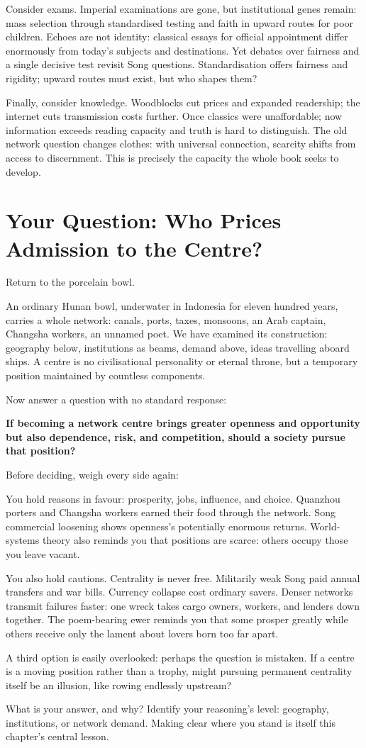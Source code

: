 Consider exams. Imperial examinations are gone, but institutional genes remain: mass selection through standardised testing and faith in upward routes for poor children. Echoes are not identity: classical essays for official appointment differ enormously from today's subjects and destinations. Yet debates over fairness and a single decisive test revisit Song questions. Standardisation offers fairness and rigidity; upward routes must exist, but who shapes them?

Finally, consider knowledge. Woodblocks cut prices and expanded readership; the internet cuts transmission costs further. Once classics were unaffordable; now information exceeds reading capacity and truth is hard to distinguish. The old network question changes clothes: with universal connection, scarcity shifts from access to discernment. This is precisely the capacity the whole book seeks to develop.

\section[Your Question: Pricing Centrality]{Your Question: Who Prices Admission to the Centre?}
Return to the porcelain bowl.

An ordinary Hunan bowl, underwater in Indonesia for eleven hundred years, carries a whole network: canals, ports, taxes, monsoons, an Arab captain, Changsha workers, an unnamed poet. We have examined its construction: geography below, institutions as beams, demand above, ideas travelling aboard ships. A centre is no civilisational personality or eternal throne, but a temporary position maintained by countless components.

Now answer a question with no standard response:

\textbf{If becoming a network centre brings greater openness and opportunity but also dependence, risk, and competition, should a society pursue that position?}

Before deciding, weigh every side again:

You hold reasons in favour: prosperity, jobs, influence, and choice. Quanzhou porters and Changsha workers earned their food through the network. Song commercial loosening shows openness's potentially enormous returns. World-systems theory also reminds you that positions are scarce: others occupy those you leave vacant.

You also hold cautions. Centrality is never free. Militarily weak Song paid annual transfers and war bills. Currency collapse cost ordinary savers. Denser networks transmit failures faster: one wreck takes cargo owners, workers, and lenders down together. The poem-bearing ewer reminds you that some prosper greatly while others receive only the lament about lovers born too far apart.

A third option is easily overlooked: perhaps the question is mistaken. If a centre is a moving position rather than a trophy, might pursuing permanent centrality itself be an illusion, like rowing endlessly upstream?

What is your answer, and why? Identify your reasoning's level: geography, institutions, or network demand. Making clear where you stand is itself this chapter's central lesson.
